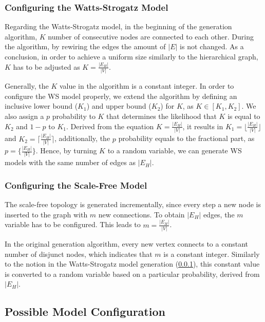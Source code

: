 \subsubsection{Configuring the Watts-Strogatz Model}\label{sec:watts_generation}

Regarding the Watts-Strogatz model, in the beginning of the generation algorithm, $K$ number of consecutive nodes are connected to each other. During the algorithm, by rewiring the edges the amount of $|E|$ is not changed. As a conclusion, in order to achieve a uniform size similarly to the hierarchical graph, $K$ has to be adjusted as $K = \frac{|E_H|}{|V|}$.

Generally, the $K$ value in the algorithm is a constant integer. In order to configure the WS model properly, we extend the algorithm by defining an inclusive lower bound ($K_1$) and upper bound ($K_2$) for $K$, as $K\in[K_1, K_2]$. We also assign a $p$ probability to $K$ that determines the likelihood that $K$ is equal to $K_2$ and $1-p$ to $K_1$. Derived from the equation $K = \frac{|E_H|}{|V|}$, it results in $K_1 = \Big\lfloor\frac{|E_H|}{|V|}\Big\rfloor$ and $K_2 = \Big\lceil\frac{|E_H|}{|V|}\Big\rceil$, additionally, the $p$ probability equals to the fractional part, as $p = \Big\{\frac{|E_H|}{|V|}\Big\}$. Hence, by turning $K$ to a random variable, we can generate WS models with the same number of edges as $|E_H|$.

\subsubsection{Configuring the Scale-Free Model}

The scale-free topology is generated incrementally, since every step a new node is inserted to the graph with $m$ new connections. To obtain $|E_H|$ edges, the $m$ variable has to be configured. This leads to $m = \frac{|E_H|}{|V|}$.

In the original generation algorithm, every new vertex connects to a constant number of disjunct nodes, which indicates that $m$ is a constant integer. Similarly to the notion in the Watts-Strogatz model generation (\ref{sec:watts_generation}), this constant value is converted to a random variable based on a particular probability, derived from $|E_H|$.

\subsection{Possible Model Configuration}

